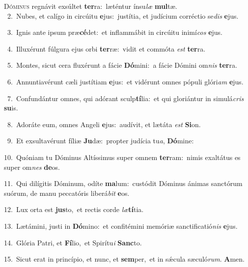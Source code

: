 \lettrine{\initial\textcolor{\initialcolor}{D}}{óminus} regnávit exsúltet \textbf{ter}\-ra:~\star læténtur ínsu\textit{læ} \textbf{mul}\-tæ.\\
{\numbfont\textcolor{\numbcolor}{~2.}}~Nubes, et calígo in circúitu \textbf{e}\-jus:~\star justítia, et judícium corréctio se\textit{dis} \textbf{e}\-jus.\par
{\numbfont\textcolor{\numbcolor}{~3.}}~Ignis ante ipsum præ\-\textbf{cé}\-det:~\star et inflammábit in circúitu inimí\textit{cos} \textbf{e}\-jus.\par
{\numbfont\textcolor{\numbcolor}{~4.}}~Illuxérunt fúlgura ejus orbi \textbf{ter}\-ræ:~\star vidit et commóta \textit{est} \textbf{ter}\-ra.\par
{\numbfont\textcolor{\numbcolor}{~5.}}~Montes, sicut cera fluxérunt a fácie \textbf{Dó}\-mini:~\star a fácie Dómini om\textit{nis} \textbf{ter}\-ra.\par
{\numbfont\textcolor{\numbcolor}{~6.}}~Annuntiavérunt cæli justítiam \textbf{e}\-jus:~\star et vidérunt omnes pópuli glóri\textit{am} \textbf{e}\-jus.\par
{\numbfont\textcolor{\numbcolor}{~7.}}~Confundántur omnes, qui adórant sculp\-\textbf{tí}\-lia:~\star et qui gloriántur in simulá\textit{cris} \textbf{su}\-is.\par
{\numbfont\textcolor{\numbcolor}{~8.}}~Adoráte eum, omnes Angeli \textbf{e}\-jus:~\star audívit, et lætáta \textit{est} \textbf{Si}\-on.\par
{\numbfont\textcolor{\numbcolor}{~9.}}~Et exsultavérunt fíliæ \textbf{Ju}\-dæ:~\star propter judícia tu\-\textit{a}\-, \textbf{Dó}\-mine:\par
{\numbfont\textcolor{\numbcolor}{10.}}~Quóniam tu Dóminus Altíssimus super omnem \textbf{ter}\-ram:~\star nimis exaltátus es super om\textit{nes} \textbf{de}\-os.\par
{\numbfont\textcolor{\numbcolor}{11.}}~Qui dilígitis Dóminum, odíte \textbf{ma}\-lum:~\star custódit Dóminus ánimas sanctórum suórum, de manu peccatóris liberá\textit{bit} \textbf{e}\-os.\par
{\numbfont\textcolor{\numbcolor}{12.}}~Lux orta est \textbf{jus}\-to,~\star et rectis corde \textit{læ}\-\textbf{tí}tia.\par
{\numbfont\textcolor{\numbcolor}{13.}}~Lætámini, justi in \textbf{Dó}\-mino:~\star et confitémini memóriæ sanctificatió\textit{nis} \textbf{e}\-jus.\par
{\numbfont\textcolor{\numbcolor}{14.}}~Glória Patri, et \textbf{Fí}\-lio,~\star et Spirítu\textit{i} \textbf{Sanc}\-to.\par
{\numbfont\textcolor{\numbcolor}{15.}}~Sicut erat in princípio, et nunc, et \textbf{sem}\-per,~\star et in sǽcula sæculó\-\textit{rum}\-. \textbf{A}\-men.\par
